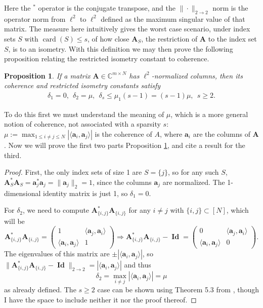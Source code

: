 \documentclass[12pt,a4paper]{amsart}
\numberwithin{equation}{section}
\theoremstyle{plain}
\newtheorem{Prop}[Th]{Proposition}
\theoremstyle{definition}
\newcommand{\BC}{\mathbb C}
\newcommand{\bda}{\mathbf{a}}
\newcommand{\bdA}{\mathbf{A}}
\DeclareMathOperator{\card}{card}
\DeclareMathOperator{\Id}{\mathbf{Id}}
\begin{document}
\begin{appendices}
Here the $^*$ operator is the conjugate transpose, and the $\|\cdot\|_{2\rightarrow2}$ norm is the operator norm from $\ell^2$ to $\ell^2$ defined as the maximum singular value of that matrix. The measure here intuitively gives the worst case scenario, under index sets $S$ with $\card(S)\leq s$, of how close $\bdA_S$, the restriction of $\bdA$ to the index set $S$, is to an isometry. With this definition we may then prove the following proposition relating the restricted isometry constant to coherence.

\begin{Prop}\label{ric-coh} If a matrix $\bdA\in\BC^{m\times N}$ has $\ell^2$-normalized columns, then its coherence and restricted isometry constants satisfy
\begin{align*}
\delta_1=0,\ \ \delta_2=\mu,\ \ \delta_s\leq\mu_1(s-1)=(s-1)\mu, \ \ s\geq2.
\end{align*}
\end{Prop}

To do this first we must understand the meaning of $\mu$, which is a more general notion of coherence, not associated with a sparsity $s$: $\mu:=\max_{1\leq i\neq j\leq N}|\langle\bda_i,\bda_j\rangle|$ is the coherence of $A$, where $\bda_i$ are the columns of $\bdA$. Now we will prove the first two parts Proposition \ref{ric-coh}, and cite a result for the third.

\begin{proof}
    First, the only index sets of size 1 are $S=\{j\}$, so for any such $S$, $\bdA_S^*\bdA_S=\bda_j^*\bda_j=\|\bda_j\|_2=1$, since the columns $\bda_j$ are normalized. The 1-dimensional identity matrix is just 1, so $\delta_1=0$.
    
    For $\delta_2$, we need to compute $\bdA_{\{i,j\}}^*\bdA_{\{i,j\}}$ for any $i\neq j$ with $\{i,j\}\subset[N]$, which will be $$\bdA_{\{i,j\}}^*\bdA_{\{i,j\}}=\begin{pmatrix}1 & \langle \bda_j,\bda_i\rangle \\ \langle \bda_i,\bda_j\rangle & 1\end{pmatrix}\Rightarrow\bdA_{\{i,j\}}^*\bdA_{\{i,j\}}-\Id=\begin{pmatrix}0 & \langle \bda_j,\bda_i\rangle \\ \langle \bda_i,\bda_j\rangle & 0\end{pmatrix}.$$ The eigenvalues of this matrix are $\pm|\langle\bda_i,\bda_j\rangle|$, so $\|\bdA_{\{i,j\}}^*\bdA_{\{i,j\}}-\Id\|_{2\rightarrow2}=|\langle\bda_i,\bda_j\rangle|$ and thus $$\delta_2=\max_{i\neq j}|\langle\bda_i,\bda_j\rangle|=\mu$$ as already defined. The $s\geq2$ case can be shown using Theorem 5.3 from \cite{fou-rau}, though I have the space to include neither it nor the proof thereof.
\end{proof}


\end{appendices}
\end{document}
